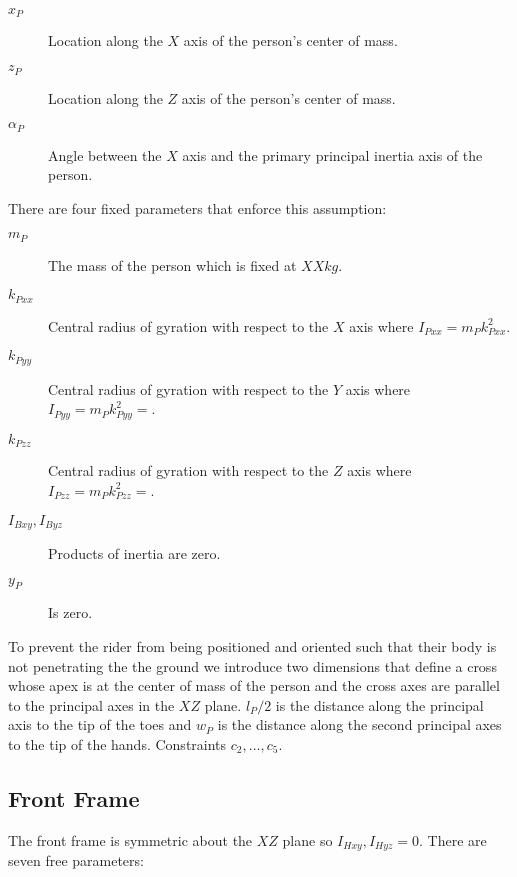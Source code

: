 \documentclass{bmd2019a}
\begin{document}
\begin{description}
  \item[$x_P$] Location along the $X$ axis of the person's center of mass.
  \item[$z_P$] Location along the $Z$ axis of the person's center of mass.
  \item[$\alpha_P$] Angle between the $X$ axis and the primary principal
    inertia axis of the person.
\end{description}

There are four fixed parameters that enforce this assumption:

\begin{description}
  \item[$m_P$] The mass of the person which is fixed at $XX \si{kg}$.
  \item[$k_{Pxx}$] Central radius of gyration with respect to the $X$ axis
    where $I_{Pxx} = m_P k_{Pxx}^2$.
  \item[$k_{Pyy}$] Central radius of gyration with respect to the $Y$ axis
    where $I_{Pyy} = m_P k_{Pyy}^2=$.
  \item[$k_{Pzz}$] Central radius of gyration with respect to the $Z$ axis
    where $I_{Pzz} = m_P k_{Pzz}^2=$.
  \item[$I_{Bxy}, I_{Byz}$] Products of inertia are zero.
  \item[$y_P$] Is zero.
\end{description}

To prevent the rider from being positioned and oriented such that their body is
not penetrating the the ground we introduce two dimensions that define a cross
whose apex is at the center of mass of the person and the cross axes are
parallel to the principal axes in the $XZ$ plane. $l_P / 2$ is the distance
along the principal axis to the tip of the toes and $w_P$ is the distance along
the second principal axes to the tip of the hands. Constraints $c_2,\ldots,c_5$.

\subsection{Front Frame}

The front frame is symmetric about the $XZ$ plane so $I_{Hxy}, I_{Hyz} = 0$.
There are seven free parameters:
\end{document}

